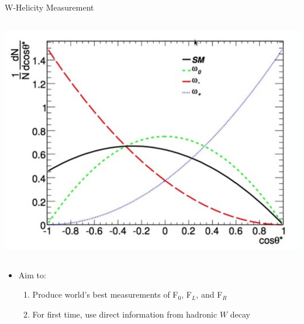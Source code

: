\documentclass{beamer}
\begin{document}
{\begin{frame}{W-Helicity Measurement}
{\begin{columns}
        \includegraphics[width=.9\textwidth]{figures/SMdistro}
      \end{columns}
      \vspace{-5pt}
      \begin{itemize}
        \footnotesize
      \item Aim to:
        \begin{enumerate}
          \scriptsize
        \item Produce world's best measurements of F$_{0}$, F$_{L}$, and  F$_{R}$
        \item For first time, use direct information from hadronic $W$ decay
        \end{enumerate}
      \end{itemize}
    }
  \end{frame}
  
}
\end{document}
